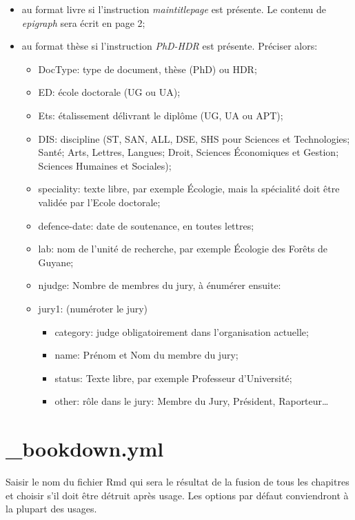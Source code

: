 \documentclass[
  11pt,
  french,
  a4paper,
  extrafontsizes,onecolumn,openright
  ]{memoir}
\begin{document}
\begin{itemize}
\item
  au format livre si l'instruction \emph{maintitlepage} est présente. Le contenu de \emph{epigraph} sera écrit en page 2;
\item
  au format thèse si l'instruction \emph{PhD-HDR} est présente. Préciser alors:

  \begin{itemize}
  \item
    DocType: type de document, thèse (PhD) ou HDR;
  \item
    ED: école doctorale (UG ou UA);
  \item
    Ets: étalissement délivrant le diplôme (UG, UA ou APT);
  \item
    DIS: discipline (ST, SAN, ALL, DSE, SHS pour Sciences et Technologies; Santé; Arts, Lettres, Langues; Droit, Sciences Économiques et Gestion; Sciences Humaines et Sociales);
  \item
    speciality: texte libre, par exemple Écologie, mais la spécialité doit être validée par l'Ecole doctorale;
  \item
    defence-date: date de soutenance, en toutes lettres;
  \item
    lab: nom de l'unité de recherche, par exemple Écologie des Forêts de Guyane;
  \item
    njudge: Nombre de membres du jury, à énumérer ensuite:
  \item
    jury1: (numéroter le jury)

    \begin{itemize}
    \item
      category: judge obligatoirement dans l'organisation actuelle;
    \item
      name: Prénom et Nom du membre du jury;
    \item
      status: Texte libre, par exemple Professeur d'Université;
    \item
      other: rôle dans le jury: Membre du Jury, Président, Raporteur\ldots{}
    \end{itemize}
  \end{itemize}
\end{itemize}

\hypertarget{bookdown.yml}{%
\section{\_bookdown.yml}\label{bookdown.yml}}

Saisir le nom du fichier Rmd qui sera le résultat de la fusion de tous les chapitres et choisir s'il doit être détruit après usage.
Les options par défaut conviendront à la plupart des usages.
\end{document}
